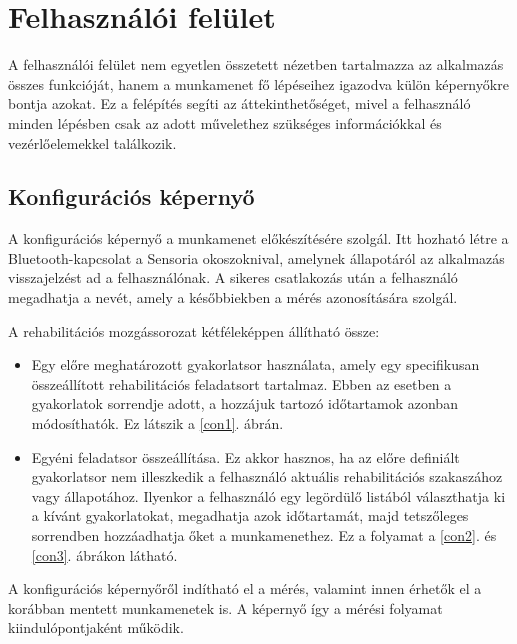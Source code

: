 \section{Felhasználói felület}

A felhasználói felület nem egyetlen összetett nézetben tartalmazza az alkalmazás összes funkcióját,
hanem a munkamenet fő lépéseihez igazodva külön képernyőkre bontja azokat.
Ez a felépítés segíti az áttekinthetőséget, mivel a felhasználó minden lépésben csak az adott
művelethez szükséges információkkal és vezérlőelemekkel találkozik.


\subsection{Konfigurációs képernyő}

A konfigurációs képernyő a munkamenet előkészítésére szolgál. Itt hozható létre a
Bluetooth-kapcsolat a Sensoria okoszoknival, amelynek állapotáról az alkalmazás visszajelzést
ad a felhasználónak. A sikeres csatlakozás után a felhasználó megadhatja a nevét,
amely a későbbiekben a mérés azonosítására szolgál.


A rehabilitációs mozgássorozat kétféleképpen állítható össze:
\begin{itemize}
    \item Egy előre meghatározott gyakorlatsor használata, amely egy specifikusan
    összeállított rehabilitációs feladatsort tartalmaz. Ebben az esetben a gyakorlatok sorrendje
    adott, a hozzájuk tartozó időtartamok azonban módosíthatók. Ez látszik a \ref{con1}. ábrán.
    \item Egyéni feladatsor összeállítása. Ez akkor hasznos, ha az előre definiált gyakorlatsor
    nem illeszkedik a felhasználó aktuális rehabilitációs szakaszához vagy állapotához.
    Ilyenkor a felhasználó egy legördülő listából választhatja ki a kívánt gyakorlatokat,
    megadhatja azok időtartamát, majd tetszőleges sorrendben hozzáadhatja őket a munkamenethez.
    Ez a folyamat a \ref{con2}. és \ref{con3}. ábrákon látható.
\end{itemize}


A konfigurációs képernyőről indítható el a mérés, valamint innen érhetők el a
korábban mentett munkamenetek is. A képernyő így a mérési folyamat kiindulópontjaként működik.



